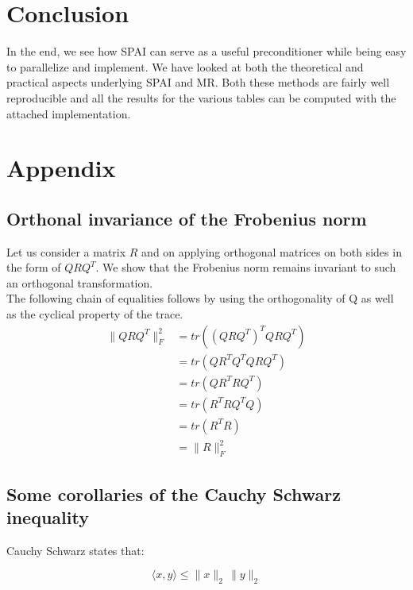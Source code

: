 \documentclass[paper=A4, fontsize=11pt]{scrartcl}
\theoremstyle{remark}
\begin{document}
\section{Conclusion}
In the end, we see how SPAI can serve as a useful preconditioner while being easy to parallelize and implement. We have looked at both the theoretical and practical aspects underlying SPAI and MR.  Both these methods are fairly well reproducible and all the results for the various tables can be computed with the attached implementation.

\clearpage



\section{Appendix}

\subsection{Orthonal invariance of the Frobenius norm}\label{sec:ortho}
Let us consider a matrix $R$ and on applying orthogonal matrices on both sides in the form of $QRQ^{T}$. We show that the Frobenius norm remains invariant to such an orthogonal transformation. \\

The following chain of equalities follows by using the orthogonality of
Q as well as the cyclical property of the trace.
\begin{equation}
\begin{aligned}
\|QRQ^{T} \|_{F}^{2}
& =  tr((QRQ^{T})^{T}QRQ^{T}) \\
& =  tr(QR^{T}Q^{T}QRQ^{T}) \\
& =  tr(QR^{T}RQ^{T}) \\
& =  tr(R^{T}RQ^{T}Q) \\
& =  tr(R^{T}R) \\
& =  \|R\|_{F}^{2} 
\end{aligned}
\end{equation}
	
\subsection{Some corollaries of the Cauchy Schwarz inequality} \label{sec:csi}

Cauchy Schwarz states that:

\begin{equation}
\langle x,y\rangle \leq \|x\|_{2} \, \|y\|_{2}
\end{equation}
\end{document}
